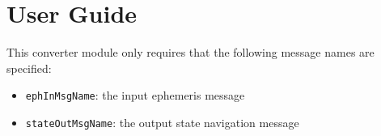 
\section{User Guide}
This converter module only requires that the following message names are specified:
\begin{itemize}
	\item {\tt ephInMsgName}: the input ephemeris message
	\item {\tt stateOutMsgName}: the output state navigation message
\end{itemize}
